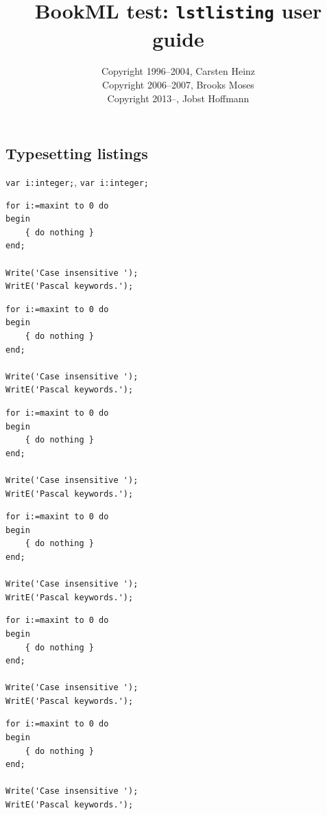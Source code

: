 \documentclass{article}
\title{BookML test: \texttt{lstlisting} user guide}
\author{Copyright 1996--2004, Carsten Heinz%
   \\ Copyright 2006--2007, Brooks Moses
   \\ Copyright 2013--, Jobst Hoffmann}
\begin{document}
\subsection{Typesetting listings}

\lstset{language=Pascal,numbers=left,frame=tblr}

{\lstset{frame=lines}
\lstinline!var i:integer;!, \lstinline$var i:integer;$

\begin{lstlisting}
for i:=maxint to 0 do
begin
    { do nothing }
end;

Write('Case insensitive ');
WritE('Pascal keywords.');
\end{lstlisting}}

\begin{lstlisting}[numbers=none]
for i:=maxint to 0 do
begin
    { do nothing }
end;

Write('Case insensitive ');
WritE('Pascal keywords.');
\end{lstlisting}

\begin{lstlisting}[numbers=right]
for i:=maxint to 0 do
begin
    { do nothing }
end;

Write('Case insensitive ');
WritE('Pascal keywords.');
\end{lstlisting}

{\lstset{frame=trbl,framesep=0pt}
\begin{lstlisting}[firstline=2,
                    lastline=5]
for i:=maxint to 0 do
begin
    { do nothing }
end;

Write('Case insensitive ');
WritE('Pascal keywords.');
\end{lstlisting}}

{\lstset{frame=lines,framesep=0pt}
\begin{lstlisting}[firstline=2,
                    lastline=5]
for i:=maxint to 0 do
begin
    { do nothing }
end;

Write('Case insensitive ');
WritE('Pascal keywords.');
\end{lstlisting}}

{\lstset{frame=topline,framesep=0pt}
\begin{lstlisting}[firstline=2,
                    lastline=5]
for i:=maxint to 0 do
begin
    { do nothing }
end;

Write('Case insensitive ');
WritE('Pascal keywords.');
\end{lstlisting}}
\end{document}
